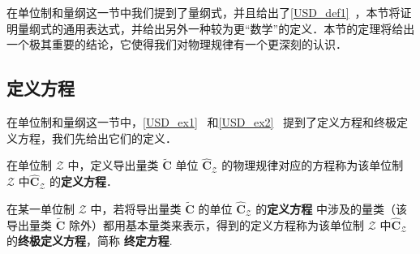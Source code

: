 
\begin{issues}
\issueTODO
\end{issues}

在单位制和量纲这一节中我们提到了量纲式，并且给出了\autoref{USD_def1}~，本节将证明量纲式的通用表达式，并给出另外一种较为更“数学”的定义．本节的定理将给出一个极其重要的结论，它使得我们对物理规律有一个更深刻的认识．
\subsection{定义方程}
在单位制和量纲这一节中，\autoref{USD_ex1}~ 和\autoref{USD_ex2}~ 提到了定义方程和终极定义方程，我们先给出它们的定义．
\begin{definition}{}
在单位制 $\mathscr{Z}$ 中，定义导出量类 $\tilde{\boldsymbol{C}}$ 单位 $\hat{\boldsymbol{C}}_{\mathscr{Z}}$ 的物理规律对应的方程称为该单位制 $\mathscr{Z}$ 中$\hat{\boldsymbol{C}}_{\mathscr{Z}}$ 的\textbf{定义方程}．
\end{definition}
\begin{definition}{}
在某一单位制 $\mathscr{Z}$ 中，若将导出量类 $\tilde{\boldsymbol{C}}$ 的单位 $\hat{\boldsymbol{C}}_{\mathscr{Z}}$ 的\textbf{定义方程} 中涉及的量类（该导出量类 $\tilde{\boldsymbol{C}}$ 除外）都用基本量类来表示，得到的定义方程称为该单位制 $\mathscr{Z}$ 中$\hat{\boldsymbol{C}}_{\mathscr{Z}}$ 的\textbf{终极定义方程}，简称 \textbf{终定方程}.
\end{definition}

